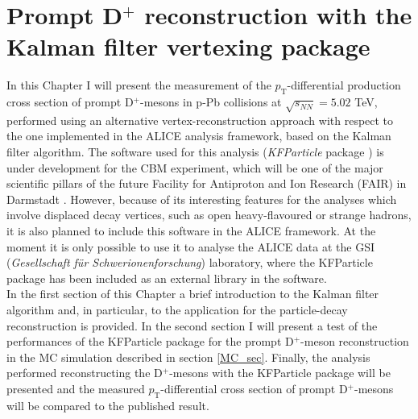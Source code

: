 \documentclass[b5paper,10pt,twoside,oldstyle,classica]{toptesi}
\newcommand{\pt}{p_\text{T}}
\begin{document}
\chapter{Prompt D$^+$ reconstruction with the Kalman filter vertexing package}
\label{KF_chapter}
In this Chapter I will present the measurement of the $\pt$-differential production cross section of prompt D$^+$-mesons in p-Pb collisions at $\sqrt{s_{NN}}=5.02$ TeV, performed using an alternative vertex-reconstruction approach with respect to the one implemented in the ALICE analysis framework, based on the Kalman filter algorithm. The software used for this analysis (\textit{KFParticle} package \cite{Kisel:2012xia}) is under development for the CBM experiment, which will be one of the major scientific pillars of the future Facility for Antiproton and Ion Research (FAIR) in Darmstadt \cite{Senger:2015wpa}. However, because of its interesting features for the analyses which involve displaced decay vertices, such as open heavy-flavoured or strange hadrons, it is also planned to include this software in the ALICE framework. At the moment it is only possible to use it to analyse the ALICE data at the GSI (\textit{Gesellschaft f\"{u}r Schwerionenforschung}) laboratory, where the KFParticle package has been included as an external library in the software.\\
In the first section of this Chapter a brief introduction to the Kalman filter algorithm and, in particular, to the application for the particle-decay reconstruction is provided. In the second section I will present a test of the performances of the KFParticle package for the prompt D$^+$-meson reconstruction in the MC simulation described in section \ref{MC_sec}. Finally, the analysis performed reconstructing the D$^+$-mesons with the KFParticle package will be presented and the measured $\pt$-differential cross section of prompt D$^+$-mesons will be compared to the published result.  
\end{document}
